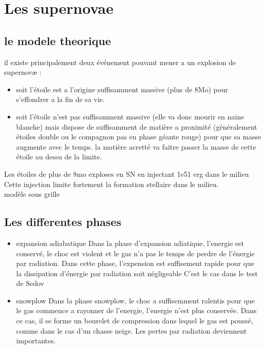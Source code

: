 \section{Les supernovae}

\subsection{le modele theorique}
il existe principalement deux événement pouvant mener a un explosion de supernovæ : 

\begin{itemize}
\item soit l'étoile est a l'origine suffisamment massive (plus de 8Mo) pour s'effondrer a la fin de sa vie.
\item soit l'étoile n'est pas suffisamment massive (elle va donc mourir en naine blanche) mais dispose de suffisamment de matière a proximité (généralement étoiles double ou le compagnon pas en phase géante rouge) pour que sa masse augmente avec le temps.
la matière acretté va faitre passer la masse de cette étoile au dessu de la limite.
\end{itemize}

Les étoiles de plus de 8mo exploses en SN en injectant 1e51 erg dans le milieu\\
Cette injection limite fortement la formation stellaire dans le milieu.\\
modèle sous grille\\


\subsection{Les differentes phases}

\begin{itemize}
\item expansion adiabatique
Dans la phase d'expansion adiatique, l'energie est conservé, le choc est violent et le gas n'a pas le temps de perdre de l'énergie par radiation.
Dans cette phase, l'expension est suffisement rapide pour que la dissipation d'énergie par radiation soit négligeable 
C'est le cas dans le test de Sedov

\item snowplow
Dans la phase snowplow, le choc a suffisemment ralentis pour que le gas commence a rayonner de l'energie, l'energie n'est plus conservée.
Dans ce cas, il se forme un bourelet de compression dans lequel le gas est poussé, comme dans le cas d'un chasse neige. 
Les pertes par radiation deviennent importantes. 
\end{itemize}




